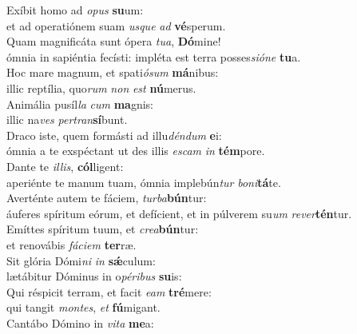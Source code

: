 \evenverse Exíbit homo ad \textit{o}\textit{pus} \textbf{su}um:~\*\\
\evenverse et ad operatiónem suam \textit{us}\textit{que} \textit{ad} \textbf{vé}sperum.\\
\oddverse Quam magnificáta sunt ópera \textit{tu}\textit{a}, \textbf{Dó}mine!~\*\\
\oddverse ómnia in sapiéntia fecísti: impléta est terra posses\textit{si}\textit{ó}\textit{ne} \textbf{tu}a.\\
\evenverse Hoc mare magnum, et spati\textit{ó}\textit{sum} \textbf{má}nibus:~\*\\
\evenverse illic reptília, quo\textit{rum} \textit{non} \textit{est} \textbf{nú}merus.\\
\oddverse Animália pusíl\textit{la} \textit{cum} \textbf{ma}gnis:~\*\\
\oddverse illic na\textit{ves} \textit{per}\textit{tran}\textbf{sí}bunt.\\
\evenverse Draco iste, quem formásti ad illu\textit{dén}\textit{dum} \textbf{e}i:~\*\\
\evenverse ómnia a te exspéctant ut des illis \textit{e}\textit{scam} \textit{in} \textbf{tém}pore.\\
\oddverse Dante te \textit{il}\textit{lis}, \textbf{cól}ligent:~\*\\
\oddverse aperiénte te manum tuam, ómnia implebún\textit{tur} \textit{bo}\textit{ni}\textbf{tá}te.\\
\evenverse Averténte autem te fáciem, \textit{tur}\textit{ba}\textbf{bún}tur:~\*\\
\evenverse áuferes spíritum eórum, et defícient, et in púlverem su\textit{um} \textit{re}\textit{ver}\textbf{tén}tur.\\
\oddverse Emíttes spíritum tuum, et \textit{cre}\textit{a}\textbf{bún}tur:~\*\\
\oddverse et renovábis \textit{fá}\textit{ci}\textit{em} \textbf{ter}ræ.\\
\evenverse Sit glória Dómi\textit{ni} \textit{in} \textbf{sǽ}culum:~\*\\
\evenverse lætábitur Dóminus in o\textit{pé}\textit{ri}\textit{bus} \textbf{su}is:\\
\oddverse Qui réspicit terram, et facit \textit{e}\textit{am} \textbf{tré}mere:~\*\\
\oddverse qui tangit \textit{mon}\textit{tes}, \textit{et} \textbf{fú}migant.\\
\evenverse Cantábo Dómino in \textit{vi}\textit{ta} \textbf{me}a:~\*\\
